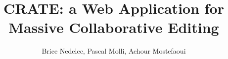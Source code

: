\documentclass{sig-alternate}
\begin{document}
\title{CRATE: a Web Application for Massive Collaborative Editing}

\author{
     \alignauthor Brice Nedelec, Pascal Molli, Achour Mostefaoui\\
     \\
     \\
}

\maketitle















\raggedright


\appendix


\end{document}

